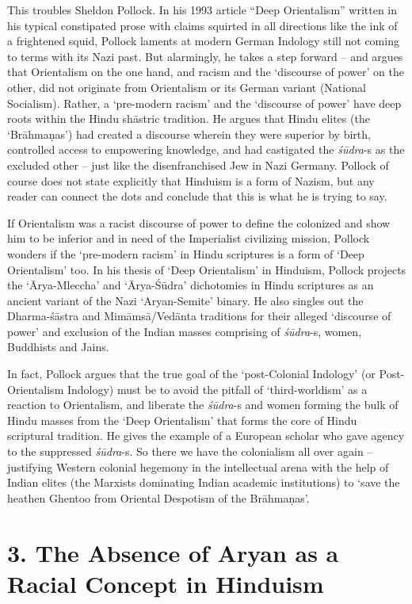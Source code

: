 This troubles Sheldon Pollock. In his 1993 article “Deep Orientalism” written in his typical constipated prose with claims squirted in all directions like the ink of a frightened squid, Pollock laments at modern German Indology still not coming to terms with its Nazi past. But alarmingly, he takes a step forward – and argues that Orientalism on the one hand, and racism and the ‘discourse of power’ on the other, did not originate from Orientalism or its German variant (National Socialism). Rather, a ‘pre-modern racism’ and the ‘discourse of power’ have deep roots within the Hindu shāstric tradition. He argues that Hindu elites (the ‘Brāhmaṇas’) had created a discourse wherein they were superior by birth, controlled access to empowering knowledge, and had castigated the \textit{śūdra}-s as the excluded other – just like the disenfranchised Jew in Nazi Germany. Pollock of course does not state explicitly that Hinduism is a form of Nazism, but any reader can connect the dots and conclude that this is what he is trying to say.

If Orientalism was a racist discourse of power to define the colonized and show him to be inferior and in need of the Imperialist civilizing mission, Pollock wonders if the ‘pre-modern racism’ in Hindu scriptures is a form of ‘Deep Orientalism’ too. In his thesis of ‘Deep Orientalism’ in Hinduism, Pollock projects the ‘Ārya-Mleccha’ and ‘Ārya-Śūdra’ dichotomies in Hindu scriptures as an ancient variant of the Nazi ‘Aryan-Semite’ binary. He also singles out the Dharma-śāstra and Mimāmsā/Vedānta traditions for their alleged ‘discourse of power’ and exclusion of the Indian masses comprising of \textit{śūdra}-s, women, Buddhists and Jains.

In fact, Pollock argues that the true goal of the ‘post-Colonial Indology’ (or Post-Orientalism Indology) must be to avoid the pitfall of ‘third-worldism’ as a reaction to Orientalism, and liberate the \textit{śūdra}-s and women forming the bulk of Hindu masses from the ‘Deep Orientalism’ that forms the core of Hindu scriptural tradition. He gives the example of a European scholar who gave agency to the suppressed \textit{śūdra}-s. So there we have the colonialism all over again – justifying Western colonial hegemony in the intellectual arena with the help of Indian elites (the Marxists dominating Indian academic institutions) to ‘save the heathen Ghentoo from Oriental Despotism of the Brāhmaṇas’.


\section*{3. The Absence of Aryan as a Racial Concept in Hinduism}

